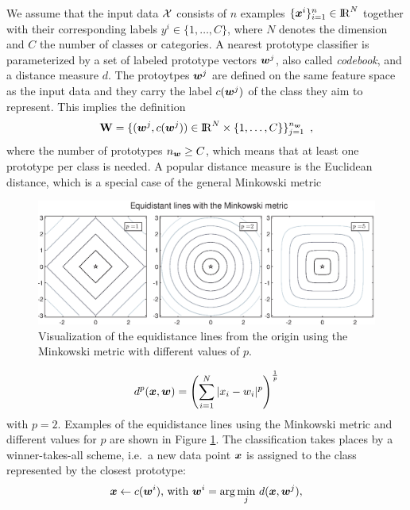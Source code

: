 We assume that the input data $\mathcal{X}$ consists of $n$ examples 
$\{\boldsymbol{x}^i\}_{i=1}^n\in{\rm I\!R}^N$ together with their corresponding labels 
$y^i\in\{1,\dots, C\}$, where $N$ denotes the dimension and $C$ the number of classes or categories. 
A nearest prototype classifier is parameterized by a set of labeled prototype vectors $\boldsymbol{w}^j$, 
also called {\it codebook}, and a distance measure $d$. 
The protoytpes $\boldsymbol{w}^j$ are defined on the same feature space as the input data and they carry 
the label $c(\boldsymbol{w}^j)$ of the class they aim to represent. 
This implies the definition
\begin{equation}
\label{eq:W}
\mathbf{W} = \{ (\boldsymbol{w}^j,c(\boldsymbol{w}^j))\in {\rm I\!R}^N \times\{1,\dots, C\}\}_{j=1}^{n_{\boldsymbol{w}}}\enspace ,
\end{equation}
where the number of prototypes $n_{\boldsymbol{w}}\ge C$, which means that at least one prototype per class is needed. 
A popular distance measure is the Euclidean distance, which is a special case of the general Minkowski metric
\begin{figure}[tpb]
\centering
\includegraphics[width=\textwidth]{pics/minkowski_metrics.eps}%
\caption[Equidistance lines using the Minkowski metric]{Visualization of the equidistance lines from the origin using the 
Minkowski metric with different values of $p$.}
\label{fig:Minkowski}
\end{figure}
\begin{equation}
\label{eq:minkowski}
 d^p(\boldsymbol{x},\boldsymbol{w}) = \left(\sum_{i=1}^N |x_i-w_i|^p\right)^\frac{1}{p}
\end{equation}
with $p=2$. 
Examples of the equidistance lines using the Minkowski metric and different values for $p$ are shown in Figure \ref{fig:Minkowski}. 
The classification takes places by a winner-takes-all scheme, i.e.\ a new data point $\boldsymbol{x}$ is assigned to the class represented by 
the closest prototype:
\begin{equation}
\label{eq:nearest_prototype_classification}
 \v{x} \leftarrow c(\v{w}^i)\text{, with }\v{w}^i=\arg\underset{j}{\min}\ d(\v{x},\v{w}^j),
\end{equation}
